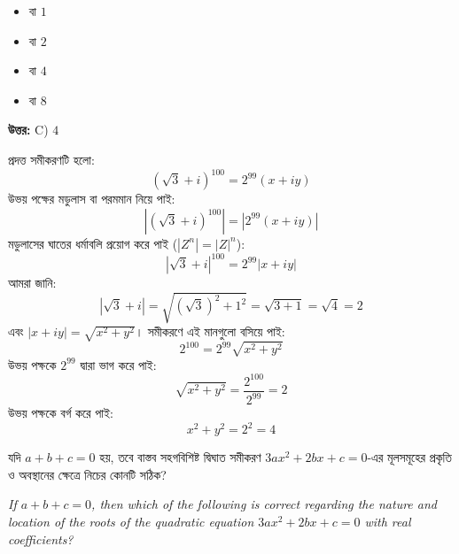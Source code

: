 \documentclass[12pt, a4paper]{article}
\begin{document}
\begin{itemize}[label={}, leftmargin=1cm, itemsep=0.5em]
    \item[\textbf{A)}] বা $1$
    \item[\textbf{B)}] বা $2$
    \item[\textbf{C)}] বা $4$
    \item[\textbf{D)}] বা $8$
\end{itemize}

\vspace{0.5em}
\begin{tcolorbox}[answerbox]
    \textbf{\color{success} উত্তর:} C) $4$
\end{tcolorbox}
\vspace{1em}

\begin{tcolorbox}[solutionbox={সমাধান (Solution)}]
    \noindent
    প্রদত্ত সমীকরণটি হলো: 
    \[ (\sqrt{3} + i)^{100} = 2^{99}(x + iy) \]
    উভয় পক্ষের মডুলাস বা পরমমান নিয়ে পাই:
    \[ \left|(\sqrt{3} + i)^{100}\right| = \left|2^{99}(x + iy)\right| \]
    মডুলাসের ঘাতের ধর্মাবলি প্রয়োগ করে পাই ($|Z^n| = |Z|^n$):
    \[ |\sqrt{3} + i|^{100} = 2^{99} |x + iy| \]
    আমরা জানি: 
    \[ |\sqrt{3} + i| = \sqrt{(\sqrt{3})^2 + 1^2} = \sqrt{3+1} = \sqrt{4} = 2 \]
    এবং $|x + iy| = \sqrt{x^2 + y^2}$। সমীকরণে এই মানগুলো বসিয়ে পাই:
    \[ 2^{100} = 2^{99} \sqrt{x^2 + y^2} \]
    উভয় পক্ষকে $2^{99}$ দ্বারা ভাগ করে পাই:
    \[ \sqrt{x^2 + y^2} = \frac{2^{100}}{2^{99}} = 2 \]
    উভয় পক্ষকে বর্গ করে পাই:
    \[ x^2 + y^2 = 2^2 = 4 \]
\end{tcolorbox}
\begin{tcolorbox}[questionbox={প্রশ্ন (Question) 26}]
    \noindent
    যদি $a+b+c = 0$ হয়, তবে বাস্তব সহগবিশিষ্ট দ্বিঘাত সমীকরণ $3ax^2 + 2bx + c = 0$-এর মূলসমূহের প্রকৃতি ও অবস্থানের ক্ষেত্রে নিচের কোনটি সঠিক?
    
    \vspace{0.8em}
    \begin{english}
    \noindent\textit{\color{darkgray}
    If $a+b+c = 0$, then which of the following is correct regarding the nature and location of the roots of the quadratic equation $3ax^2 + 2bx + c = 0$ with real coefficients?
    }
    \end{english}
\end{tcolorbox}
\end{document}
